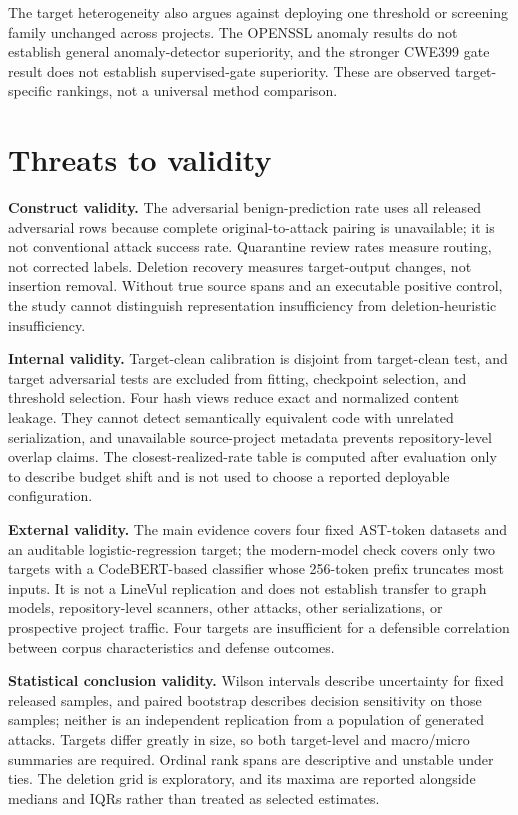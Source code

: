 \documentclass[a4paper,fleqn]{cas-dc}
\newcommand{\dataset}[1]{\textsc{#1}}
\begin{document}
The target heterogeneity also argues against deploying one threshold or screening family unchanged across projects. The \dataset{OPENSSL} anomaly results do not establish general anomaly-detector superiority, and the stronger \dataset{CWE399} gate result does not establish supervised-gate superiority. These are observed target-specific rankings, not a universal method comparison.

\section{Threats to validity}\label{sec:threats}

\textbf{Construct validity.} The adversarial benign-prediction rate uses all released adversarial rows because complete original-to-attack pairing is unavailable; it is not conventional attack success rate. Quarantine review rates measure routing, not corrected labels. Deletion recovery measures target-output changes, not insertion removal. Without true source spans and an executable positive control, the study cannot distinguish representation insufficiency from deletion-heuristic insufficiency.

\textbf{Internal validity.} Target-clean calibration is disjoint from target-clean test, and target adversarial tests are excluded from fitting, checkpoint selection, and threshold selection. Four hash views reduce exact and normalized content leakage. They cannot detect semantically equivalent code with unrelated serialization, and unavailable source-project metadata prevents repository-level overlap claims. The closest-realized-rate table is computed after evaluation only to describe budget shift and is not used to choose a reported deployable configuration.

\textbf{External validity.} The main evidence covers four fixed AST-token datasets and an auditable logistic-regression target; the modern-model check covers only two targets with a CodeBERT-based classifier whose 256-token prefix truncates most inputs. It is not a LineVul replication and does not establish transfer to graph models, repository-level scanners, other attacks, other serializations, or prospective project traffic. Four targets are insufficient for a defensible correlation between corpus characteristics and defense outcomes.

\textbf{Statistical conclusion validity.} Wilson intervals describe uncertainty for fixed released samples, and paired bootstrap describes decision sensitivity on those samples; neither is an independent replication from a population of generated attacks. Targets differ greatly in size, so both target-level and macro/micro summaries are required. Ordinal rank spans are descriptive and unstable under ties. The deletion grid is exploratory, and its maxima are reported alongside medians and IQRs rather than treated as selected estimates.
\end{document}

